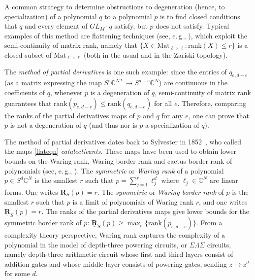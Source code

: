 \documentclass[11pt]{article}
\numberwithin{equation}{section}
\theoremstyle{definition}
\theoremstyle{plain}
\newcommand{\eg}{e.\,g.}
\newcommand{\bfR}{\mathbf{R}}
\newcommand{\bbC}{\mathbb{C}}
\def\BC{\mathbb C}
\def\trank{\mathrm{rank}}
\def\ur{\underline {\mathbf R}}
\newcommand{\Mat}{\mathrm{Mat}}
\begin{document}
A common strategy to determine obstructions to degeneration (hence, to specialization) of a polynomial $q$ to a polynomial $p$ is to find closed conditions that $q$ and every element of $GL_M \cdot q$ satisfy, but $p$ does not satisfy. Typical examples of this method are flattening techniques (see, \eg, \cite{MR2901512}), which exploit the semi-continuity of matrix rank, namely that $\{ X \in \Mat_{\ell \times \ell} : \trank( X) \leq r\}$ is a closed subset of $\Mat_{\ell \times \ell}$ (both in the usual and in the Zariski topology).

 The \emph{method of partial derivatives} is one such example: since the entries of $q_{e,d-e}$ (as a matrix expressing the map $S^e \bbC^{N*}  \to S^{d-e} \bbC^N$) are continuous in the coefficients of $q$, whenever $p$ is a degeneration of $q$, semi-continuity of matrix rank guarantees that $\trank(p_{e,d-e})\leq \trank(q_{e,d-e})$ for all $e$. Therefore, comparing the ranks of the partial derivatives maps of $p$ and $q$ for any $e$, one can prove that $p$ is not a degeneration of $q$ (and thus nor is $p$ a specialization of $q$). 

 The method of partial derivatives  dates back to Sylvester in 1852~\cite{sylvestercat}, who called the maps \eqref{flateqn} \emph{catalecticants}. These maps have been used to obtain lower bounds on the Waring rank, Waring border rank and cactus border rank  of polynomials (see, \eg, \cite{MR3121848,MR1735271}). The \emph{symmetric} or \emph{Waring rank} of a polynomial $p\in S^d\BC^N$ is the smallest $r$ such that $p=\sum_{j=1}^r \ell_j^d$ where $\ell_j\in \BC^N$ are linear forms. One writes
%
$\bfR_S(p)=r$.  %
 The \emph{symmetric} or \emph{Waring border rank} of $p$ is the smallest $r$ such that $p$ is a limit of polynomials of Waring rank $r$, and one writes  $\ur_S(p)=r$.  The ranks of the partial derivatives maps give lower bounds for the symmetric border rank of $p$: $\ur_S(p) \geq \max_{e} \{ \trank(p_{e,d-e})\}$. {}From a complexity theory perspective, Waring rank captures the complexity of a polynomial in the model of depth-three powering circuits, or $\Sigma\Lambda\Sigma$ circuits, namely depth-three arithmetic circuit whose first and third 
layers consist of addition gates and whose middle layer consists of powering gates, sending $z\mapsto z^d$ for some $d$.
\end{document}
